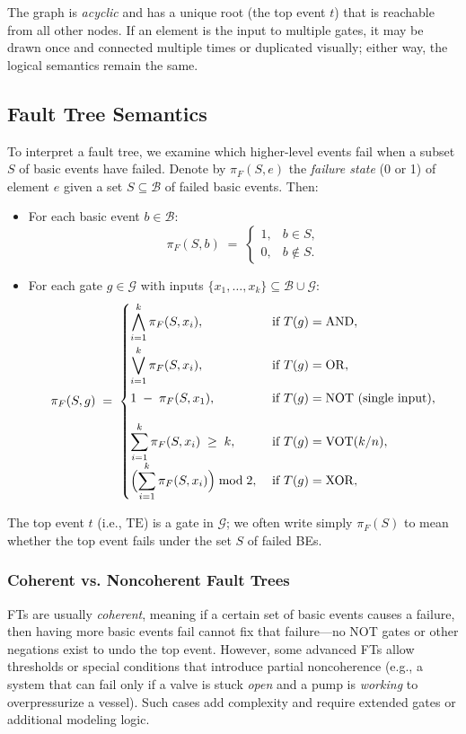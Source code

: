 The graph is \emph{acyclic} and has a unique root (the top event \(t\)) that is reachable from all other nodes. If an element is the input to multiple gates, it may be drawn once and connected multiple times or duplicated visually; either way, the logical semantics remain the same.

\subsection{Fault Tree Semantics}

To interpret a fault tree, we examine which higher-level events fail when a subset \(S\) of basic events have failed. Denote by \(\pi_F(S, e)\) the \emph{failure state} (0 or 1) of element \(e\) given a set \(S\subseteq \mathcal{B}\) of failed basic events. Then:

\begin{itemize}
\item For each basic event \(b \in \mathcal{B}\):
  \[
    \pi_F(S, b) \;=\;
    \begin{cases}
      1, & b \in S,\\
      0, & b \notin S.
    \end{cases}
  \]
\item For each gate \(g \in \mathcal{G}\) with inputs \(\{x_1,\dots,x_k\}\subseteq \mathcal{B}\cup\mathcal{G}\):
  \[
  \pi_F(S,g) 
  \;=\;
  \begin{cases}
  \displaystyle
    \bigwedge_{i=1}^k \pi_F(S, x_i),
    & \;\text{if }T(g)=\mathrm{AND},\\[1.2em]
  \displaystyle
    \bigvee_{i=1}^k \pi_F(S, x_i),
    & \;\text{if }T(g)=\mathrm{OR},\\[1.2em]
  \displaystyle
    1 \;-\; \pi_F(S, x_1),
    & \;\text{if }T(g)=\mathrm{NOT} \text{ (single input)},\\[1.2em]
  \displaystyle
    \sum_{i=1}^k \pi_F(S,x_i)\;\ge\;k,
    & \;\text{if }T(g)=\mathrm{VOT}(k/n),\\
  \displaystyle
    \Bigl(\sum_{i=1}^k \pi_F(S,x_i)\Bigr)\bmod 2,
    & \;\text{if }T(g)=\mathrm{XOR} ,\\[0.6em]
  \end{cases}
  \]
\end{itemize}
The top event \(t\) (i.e., \(\mathrm{TE}\)) is a gate in \(\mathcal{G}\); we often write simply \(\pi_F(S)\) to mean whether the top event fails under the set \(S\) of failed BEs.

\subsubsection{Coherent vs. Noncoherent Fault Trees}
FTs are usually \emph{coherent}, meaning if a certain set of basic events causes a failure, then having more basic events fail cannot fix that failure—no NOT gates or other negations exist to undo the top event. However, some advanced FTs allow thresholds or special conditions that introduce partial noncoherence (e.g., a system that can fail only if a valve is stuck \emph{open} and a pump is \emph{working} to overpressurize a vessel). Such cases add complexity and require extended gates or additional modeling logic.

